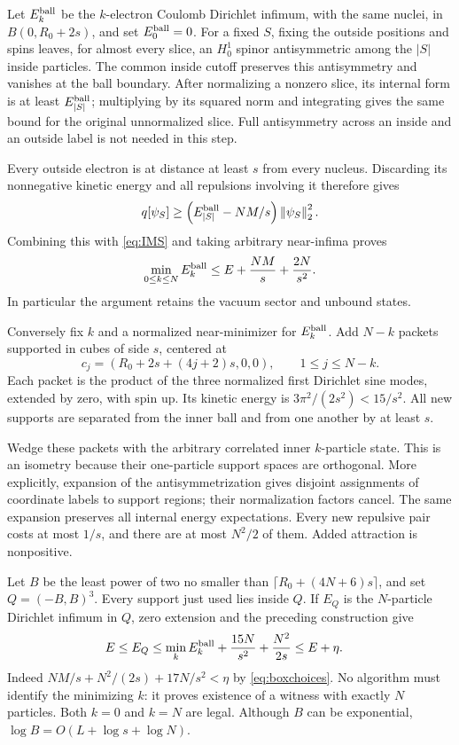 \documentclass[11pt]{article}
\theoremstyle{remark}\newtheorem{remark}[theorem]{Remark}
\newcommand{\norm}[1]{\left\lVert#1\right\rVert}
\numberwithin{equation}{section}
\begin{document}
Let $E_k^{\rm ball}$ be the $k$-electron Coulomb Dirichlet infimum, with the
same nuclei, in $B(0,R_0+2s)$, and set $E_0^{\rm ball}=0$. For a fixed $S$,
fixing the outside positions and spins leaves, for almost every slice, an
$H^1_0$ spinor antisymmetric among the $|S|$ inside particles. The common
inside cutoff preserves this antisymmetry and vanishes at the ball boundary.
After normalizing a nonzero slice, its internal form is at least
$E_{|S|}^{\rm ball}$; multiplying by its squared norm and integrating gives
the same bound for the original unnormalized slice. Full antisymmetry across
an inside and an outside label is not needed in this step.

Every outside electron is at distance at least $s$ from every nucleus.
Discarding its nonnegative kinetic energy and all repulsions involving it
therefore gives
\[
 q[\psi_S]\geq\left(E_{|S|}^{\rm ball}-NM/s\right)\norm{\psi_S}_2^2.
\]
Combining this with \eqref{eq:IMS} and taking arbitrary near-infima proves
\begin{equation}\label{eq:allk}
 \min_{0\leq k\leq N}E_k^{\rm ball}
 \leq E+\frac{NM}s+\frac{2N}{s^2}.
\end{equation}
In particular the argument retains the vacuum sector and unbound states.

Conversely fix $k$ and a normalized near-minimizer for $E_k^{\rm ball}$.
Add $N-k$ packets supported in cubes of side $s$, centered at
\[
 c_j=(R_0+2s+(4j+2)s,0,0),\qquad 1\leq j\leq N-k.
\]
Each packet is the product of the three normalized first Dirichlet sine
modes, extended by zero, with spin up. Its kinetic energy is
$3\pi^2/(2s^2)<15/s^2$. All new supports are separated from the inner ball
and from one another by at least $s$.

Wedge these packets with the arbitrary correlated inner $k$-particle state.
This is an isometry because their one-particle support spaces are
orthogonal. More explicitly, expansion of the antisymmetrization gives
disjoint assignments of coordinate labels to support regions; their
normalization factors cancel. The same expansion preserves all internal
energy expectations. Every new repulsive pair costs at most $1/s$, and
there are at most $N^2/2$ of them. Added attraction is nonpositive.

Let $B$ be the least power of two no smaller than
$\lceil R_0+(4N+6)s\rceil$, and set $Q=(-B,B)^3$. Every support just used
lies inside $Q$. If $E_Q$ is the $N$-particle Dirichlet infimum in $Q$,
zero extension and the preceding construction give
\begin{align}
 E\leq E_Q
 &\leq\min_k E_k^{\rm ball}+\frac{15N}{s^2}+\frac{N^2}{2s}
 \leq E+\eta.\label{eq:boxerror}
\end{align}
Indeed $NM/s+N^2/(2s)+17N/s^2<\eta$ by \eqref{eq:boxchoices}.
No algorithm must identify the minimizing $k$: it proves existence of a
witness with exactly $N$ particles. Both $k=0$ and $k=N$ are legal.
Although $B$ can be exponential, $\log B=O(L+\log s+\log N)$.
\end{document}
